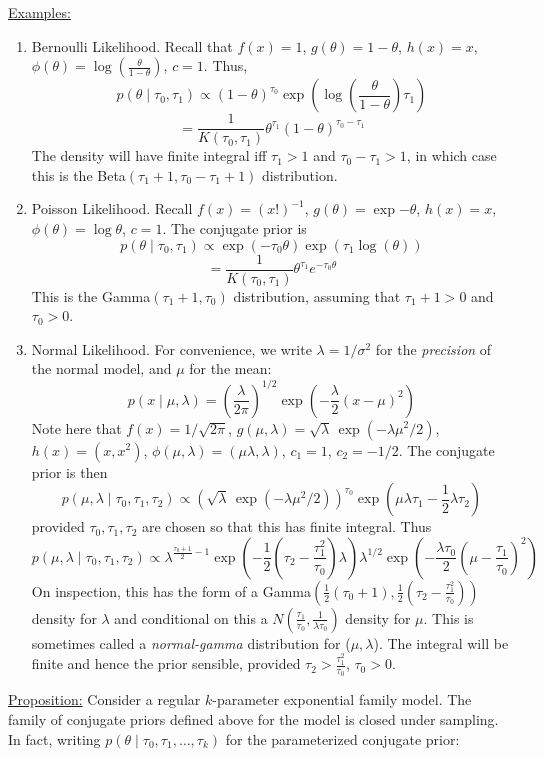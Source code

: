 \documentclass[12pt]{article}
\begin{document}
\underline{Examples:}
\begin{enumerate}
\item Bernoulli Likelihood.  Recall that $f(x)=1$, $g(\theta)=1-\theta$, $h(x)=x$, $\phi(\theta)=\log\left(\frac{\theta}{1-\theta} \right)$, $c=1$.   Thus,
$$p(\theta\mid \tau_0,\tau_1) \propto (1-\theta)^{\tau_0} \exp\left(
  \log(\frac{\theta}{1-\theta} ) \tau_1\right)$$
\vskip 2mm
$$=\frac{1}{K(\tau_0,\tau_1)} \theta^{\tau_1}
(1-\theta)^{\tau_0-\tau_1}$$
The density will have finite integral iff $\tau_1> 1$ and $\tau_0-\tau_1>1$, in which case this is the Beta$(\tau_1+1, \tau_0-\tau_1+1)$ distribution.
\item Poisson Likelihood.  Recall $f(x)=(x!)^{-1}$,
  $g(\theta)=\exp{-\theta}$, $h(x)=x$, $\phi(\theta)= \log \theta$, $c=1$.  The conjugate prior is 
$$p(\theta\mid \tau_0,\tau_1) \propto \exp(-\tau_0 \theta) \exp(\tau_1
\log(\theta))$$
$$=\frac{1}{K(\tau_0,\tau_1)} \theta^{\tau_1}
e^{-\tau_0 \theta}$$
This is the Gamma$(\tau_1+1,\tau_0)$ distribution, assuming that
$\tau_1+1>0$ and $\tau_0>0$.
\item Normal Likelihood.  For convenience, we write
  $\lambda=1/\sigma^2$ for the {\it precision} of the normal
  model, and $\mu$ for the mean:
$$p(x\mid \mu,\lambda)=(\frac{\lambda}{2\pi})^{1/2}
\exp\left(-\frac{\lambda}{2} (x-\mu)^2 \right)$$
\vskip 2mm
Note here that $f(x)=1/\sqrt{2\pi}$, $g(\mu,\lambda)=\sqrt{\lambda}\,
 \exp(- \lambda \mu^2/2)$, $h(x)=(x,x^2)$, $\phi(\mu,\lambda)=(\mu
\lambda,\lambda)$, $c_1=1$, $c_2=-1/2$. 
The conjugate prior is then
$$p(\mu,\lambda\mid \tau_0,\tau_1,\tau_2)\propto
\left(\sqrt{\lambda}\, \exp(-\lambda \mu^2/2)\right)^{\tau_0} \exp\left(
  \mu \lambda \tau_1 - \frac{1}{2} \lambda \tau_2 \right)$$
provided $\tau_0,\tau_1,\tau_2$ are chosen so that this has finite
integral.  
\vskip 4mm
Thus
$$p(\mu,\lambda\mid \tau_0,\tau_1,\tau_2)\propto \lambda^{\frac{\tau_0+1}{2}-1} \exp\left(-\frac{1}{2}(\tau_2 -
  \frac{\tau_1^2}{\tau_0})\lambda\right) \lambda^{1/2} \exp\left(-\frac{\lambda \tau_0}{2} (\mu - \frac{\tau_1}{\tau_0})^2 \right)$$
On inspection, this has the form of a Gamma$(\frac{1}{2}(\tau_0+1),\frac{1}{2}
(\tau_2-\frac{\tau_1^2}{\tau_0}))$ density for $\lambda$ and conditional
on this a $N(\frac{\tau_1}{\tau_0},\frac{1}{\lambda \tau_0})$ density
for $\mu$.  This is sometimes called a {\it normal-gamma} distribution for
 ($\mu,\lambda$).  The integral will be finite and hence the prior
sensible, provided $\tau_2>\frac{\tau_1^2}{\tau_0}$, $\tau_0>0$.
\end{enumerate}
\vskip 4mm
\underline{Proposition:}  Consider a regular $k$-parameter exponential
family model.  The family of conjugate priors defined above for the
model is closed under sampling.  In fact, writing
$p(\theta\mid\tau_0,\tau_1,\ldots,\tau_k)$ for the parameterized
conjugate prior:
\end{document}
